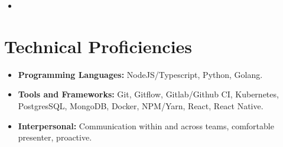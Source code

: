 \documentclass[11pt,a4paper,sans]{moderncv}        %
\begin{document}
\vspace{5pt}

\begin{itemize}

\item{}

\end{itemize}

\vspace{2pt}

\section{Technical Proficiencies}

\vspace{4pt}

\begin{itemize}

\item \textbf{Programming Languages:} NodeJS/Typescript, Python, Golang.

\vspace{4pt}

\item \textbf{Tools and Frameworks:} Git, Gitflow, Gitlab/Github CI, Kubernetes, PostgresSQL, MongoDB, Docker, NPM/Yarn, React, React Native.

\vspace{4pt}

\item \textbf{Interpersonal:} Communication within and across teams, comfortable presenter, proactive.


\end{itemize}

\nocite{*}



\end{document}
